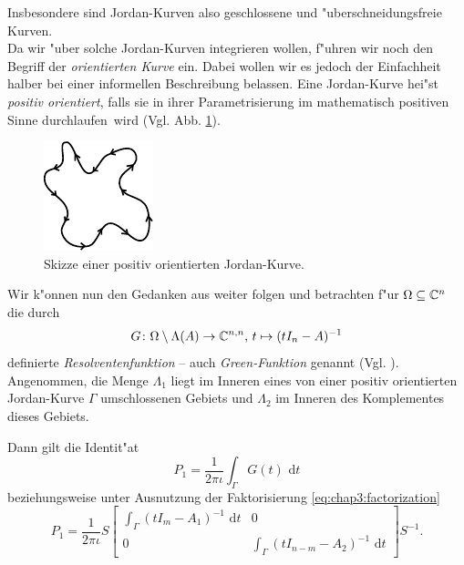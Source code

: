 Insbesondere sind Jordan-Kurven also geschlossene und "uberschneidungsfreie Kurven.\\

Da wir "uber solche Jordan-Kurven integrieren wollen, f"uhren wir noch den Begriff der \emph{orientierten Kurve} ein.
Dabei wollen wir es jedoch der Einfachheit halber bei einer informellen Beschreibung belassen.
Eine Jordan-Kurve hei"st \emph{positiv orientiert},
falls sie in ihrer Parametrisierung im mathematisch positiven Sinne \glqq durchlaufen\grqq\ wird (Vgl. Abb. \ref{im:chap3:jKurveOrientiert}).

\newpage

\begin{figure}[h!]
\center
\includegraphics[width=.27\linewidth]{images/jKurveOrientiert}
\caption{Skizze einer positiv orientierten Jordan-Kurve.}\label{im:chap3:jKurveOrientiert}
\end{figure}




Wir k"onnen nun den Gedanken aus \cite[Abschnitt 4.9]{liesen} weiter folgen und betrachten f"ur $\Omega\subseteq\mathbb{C}^n$ die durch
\[
G\colon\Omega \setminus \Lambda(A) \to\mathbb{C}^{n,n}
\text{, }
t \mapsto (t I_n - A)^{-1}
\]
definierte \emph{Resolventenfunktion} -- auch \emph{Green-Funktion} genannt (Vgl. \cite{polizzi}).
Angenommen, die Menge $\Lambda_1$ liegt im Inneren eines von einer positiv orientierten Jordan-Kurve $\Gamma$ umschlossenen
Gebiets und $\Lambda_2$ im Inneren des Komplementes dieses Gebiets.

Dann gilt die Identit"at
\begin{equation}\label{eq:chap3:kontur}
P_1 = \frac{1}{2\pi\iota}\int_\Gamma G(t)\text{ d}t
\end{equation}
beziehungsweise unter Ausnutzung der Faktorisierung \eqref{eq:chap3:factorization}
\begin{equation}\label{eq:chap3:konturMatrix}
P_1 = \frac{1}{2\pi\iota} S
\begin{bmatrix}
\int_\Gamma (t I_m - A_1)^{-1} \text{ d}t & 0 \\
0 & \int_\Gamma (t I_{n-m} - A_2)^{-1} \text{ d}t
\end{bmatrix} S^{-1}.
\end{equation}

